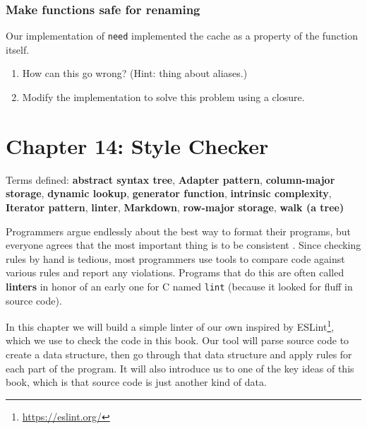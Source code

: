 \documentclass[krantzl]{krantz}
\newcommand{\glossref}[1]{\textbf{#1}}
\newcommand{\hreffoot}[2]{{#1}\footnote{\href{#2}{#2}}}
\begin{document}
\subsection*{Make functions safe for renaming}


Our implementation of \texttt{need} implemented the cache as a property of the function itself.

\begin{enumerate}

\item 

How can this go wrong?
    (Hint: thing about aliases.)



\item 

Modify the implementation to solve this problem using a closure.



\end{enumerate}

\chapter{Chapter 14: Style Checker}\label{style-checker}


\noindent 
    Terms defined:
    \glossref{abstract syntax tree}, \glossref{Adapter pattern}, \glossref{column-major storage}, \glossref{dynamic lookup}, \glossref{generator function}, \glossref{intrinsic complexity}, \glossref{Iterator pattern}, \glossref{linter}, \glossref{Markdown}, \glossref{row-major storage}, \glossref{walk (a tree)}



Programmers argue endlessly about the best way to format their programs,
but everyone agrees that the most important thing is to be consistent
\cite{Binkley2012,Johnson2019}.
Since checking rules by hand is tedious,
most programmers use tools to compare code against various rules and report any violations.
Programs that do this are often called \glossref{linters}
in honor of an early one for C named \texttt{lint}
(because it looked for fluff in source code).


In this chapter we will build a simple linter of our own inspired by \hreffoot{ESLint}{https://eslint.org/},
which we use to check the code in this book.
Our tool will parse source code to create a data structure,
then go through that data structure and apply rules for each part of the program.
It will also introduce us to one of the key ideas of this book,
which is that source code is just another kind of data.
\end{document}
